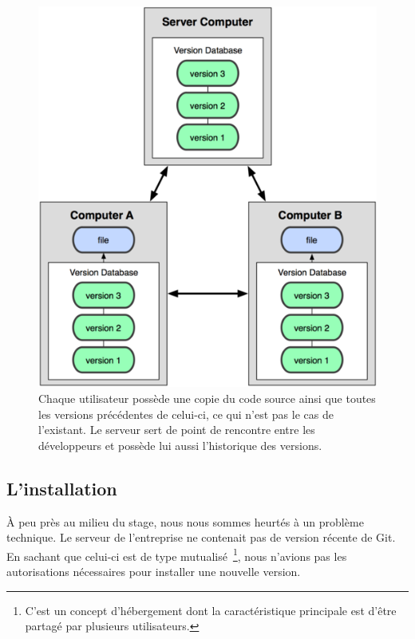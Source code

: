 \begin{figure}
  \begin{center}
    \includegraphics[scale=1.57]{images/workflow.png}
    \caption{ Chaque utilisateur possède une copie du code source
    ainsi que toutes les versions précédentes de celui-ci, ce qui n'est pas
    le cas de l'existant. Le serveur sert de point de rencontre entre les
    développeurs et possède lui aussi l’historique des versions.}
    \label{flow}
  \end{center}
\end{figure}

\subsection{L'installation} %
\label{sub:L'installation}

À peu près au milieu du stage, nous nous sommes heurtés à un problème
technique. Le serveur de l'entreprise ne contenait pas de version
récente de Git. En sachant que celui-ci est de type mutualisé\,
\footnote{C'est un concept d'hébergement dont la caractéristique
principale est d'être partagé par plusieurs utilisateurs.}, nous
n'avions pas les autorisations nécessaires pour installer une nouvelle
version.

